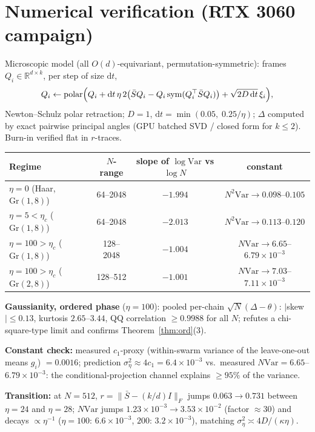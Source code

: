 \documentclass[11pt]{article}
\theoremstyle{definition}
\newcommand{\Gr}{\mathrm{Gr}}
\newcommand{\Var}{\mathrm{Var}}
\newcommand{\dd}{\mathrm{d}}
\begin{document}
\section{Numerical verification (RTX 3060 campaign)}

Microscopic model (all $O(d)$-equivariant, permutation-symmetric):
frames $Q_i\in\mathbb R^{d\times k}$, per step of size $\dd t$,
\[
Q_i\leftarrow \mathrm{polar}\Bigl(Q_i+\dd t\,\eta\,2\bigl(\bar SQ_i-Q_i\,\mathrm{sym}(Q_i^\top\bar SQ_i)\bigr)
+\sqrt{2D\,\dd t}\,\xi_i\Bigr),
\]
Newton--Schulz polar retraction; $D=1$, $\dd t=\min(0.05,\;0.25/\eta)$;
$\Delta$ computed by exact pairwise principal angles (GPU batched SVD / closed form
for $k\le2$). Burn-in verified flat in $r$-traces.

\begin{center}
\begin{tabular}{lccc}
\hline
Regime & $N$-range & slope of $\log\Var$ vs $\log N$ & constant \\
\hline
$\eta=0$ (Haar, $\Gr(1,8)$) & 64--2048 & $-1.994$ & $N^2\Var\to0.098$--$0.105$\\
$\eta=5<\eta_c$ ($\Gr(1,8)$) & 64--2048 & $-2.013$ & $N^2\Var\to0.113$--$0.120$\\
$\eta=100>\eta_c$ ($\Gr(1,8)$) & 128--2048 & $-1.004$ & $N\Var\to6.65$--$6.79\times10^{-3}$\\
$\eta=100>\eta_c$ ($\Gr(2,8)$) & 128--512 & $-1.001$ & $N\Var\to7.03$--$7.11\times10^{-3}$\\
\hline
\end{tabular}
\end{center}

\textbf{Gaussianity, ordered phase} ($\eta=100$): pooled per-chain
$\sqrt N(\Delta-\theta)$: $|$skew$|\le0.13$, kurtosis $2.65$--$3.44$, QQ correlation
$\ge0.9988$ for all $N$; refutes a chi-square-type limit and confirms
Theorem~\ref{thm:ord}(3).

\textbf{Constant check:} measured $c_1$-proxy (within-swarm variance of the
leave-one-out means $g_i$) $=0.0016$; prediction $\sigma_\eta^2\approx4c_1=6.4\times
10^{-3}$ vs.\ measured $N\Var=6.65$--$6.79\times10^{-3}$: the conditional-projection
channel explains $\ge95\%$ of the variance.

\textbf{Transition:} at $N=512$, $r=\|\bar S-(k/d)I\|_F$ jumps
$0.063\to0.731$ between $\eta=24$ and $\eta=28$; $N\Var$ jumps
$1.23\times10^{-3}\to3.53\times10^{-2}$ (factor $\approx30$) and decays
$\propto\eta^{-1}$ ($\eta=100{:}\,6.6\times10^{-3}$, $200{:}\,3.2\times10^{-3}$),
matching $\sigma_\eta^2\asymp4D/(\kappa\eta)$.
\end{document}
